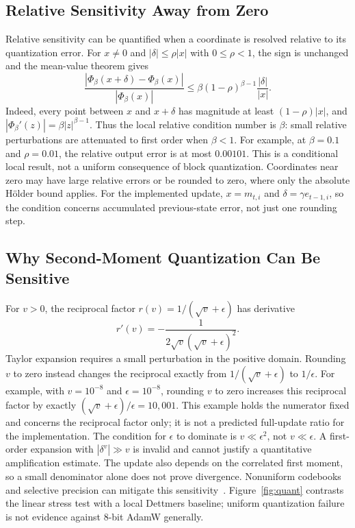 \documentclass{article}
\begin{document}
\subsection{Relative Sensitivity Away from Zero}
Relative sensitivity can be quantified when a coordinate is resolved relative to its quantization error. For $x\ne0$ and $|\delta|\le\rho|x|$ with $0\le\rho<1$, the sign is unchanged and the mean-value theorem gives
\begin{equation}\label{eq:relative-power-sensitivity}
\frac{|\Phi_\beta(x+\delta)-\Phi_\beta(x)|}{|\Phi_\beta(x)|}
\le \beta(1-\rho)^{\beta-1}\frac{|\delta|}{|x|}.
\end{equation}
Indeed, every point between $x$ and $x+\delta$ has magnitude at least $(1-\rho)|x|$, and $|\Phi_\beta'(z)|=\beta|z|^{\beta-1}$. Thus the local relative condition number is $\beta$: small relative perturbations are attenuated to first order when $\beta<1$. For example, at $\beta=0.1$ and $\rho=0.01$, the relative output error is at most $0.00101$. This is a conditional local result, not a uniform consequence of block quantization. Coordinates near zero may have large relative errors or be rounded to zero, where only the absolute H\"older bound applies. For the implemented update, $x=m_{t,i}$ and $\delta=\gamma e_{t-1,i}$, so the condition concerns accumulated previous-state error, not just one rounding step.

\subsection{Why Second-Moment Quantization Can Be Sensitive}
For $v>0$, the reciprocal factor $r(v)=1/(\sqrt v+\epsilon)$ has derivative
\begin{equation}
r'(v)=-\frac{1}{2\sqrt v(\sqrt v+\epsilon)^2}.
\end{equation}
Taylor expansion requires a small perturbation in the positive domain. Rounding $v$ to zero instead changes the reciprocal exactly from $1/(\sqrt v+\epsilon)$ to $1/\epsilon$. For example, with $v=10^{-8}$ and $\epsilon=10^{-8}$, rounding $v$ to zero increases this reciprocal factor by exactly $(\sqrt v+\epsilon)/\epsilon=10{,}001$. This example holds the numerator fixed and concerns the reciprocal factor only; it is not a predicted full-update ratio for the implementation. The condition for $\epsilon$ to dominate is $v\ll\epsilon^2$, not $v\ll\epsilon$. A first-order expansion with $|\delta^v|\gg v$ is invalid and cannot justify a quantitative amplification estimate. The update also depends on the correlated first moment, so a small denominator alone does not prove divergence. Nonuniform codebooks and selective precision can mitigate this sensitivity~\citep{dettmers2022bit,li2024memory}. Figure~\ref{fig:quant} contrasts the linear stress test with a local Dettmers baseline; uniform quantization failure is not evidence against 8-bit AdamW generally.
\end{document}
